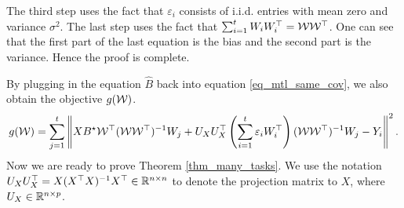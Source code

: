 	The third step uses the fact that $\varepsilon_i$ consists of i.i.d. entries with mean zero and variance $\sigma^2$.
	The last step uses the fact that $\sum_{i=1}^t W_i W_i^{\top} = {\mathcal W} {\mathcal W}^{\top}$.
	One can see that the first part of the last equation is the bias and the second part is the variance.
	Hence the proof is complete.

	By plugging in the equation $\hat{B}$ back into equation \eqref{eq_mtl_same_cov}, we also obtain the objective $g({\mathcal W})$.
	\begin{align}
		g(\mathcal W) = \sum_{j=1}^t \left\| X B^{\star} {\mathcal W}^{\top} ({\mathcal W}{\mathcal W}^{\top})^{-1} W_j + U_X U_X^{\top} \left({\sum_{i=1}^t \varepsilon_i W_i^{\top}}\right) ({\mathcal W}{\mathcal W}^{\top})^{-1} W_j - Y_i \right\|^2. \label{eq_mtl_output_layer}
	\end{align}
	Now we are ready to prove Theorem \ref{thm_many_tasks}.
	We use the notation $U_X U_X^{\top} = X (X^{\top} X)^{-1} X^{\top} \in\mathbb{R}^{n \times n}$ to denote the projection matrix to $X$, where $U_X\in\mathbb{R}^{n \times p}$.





